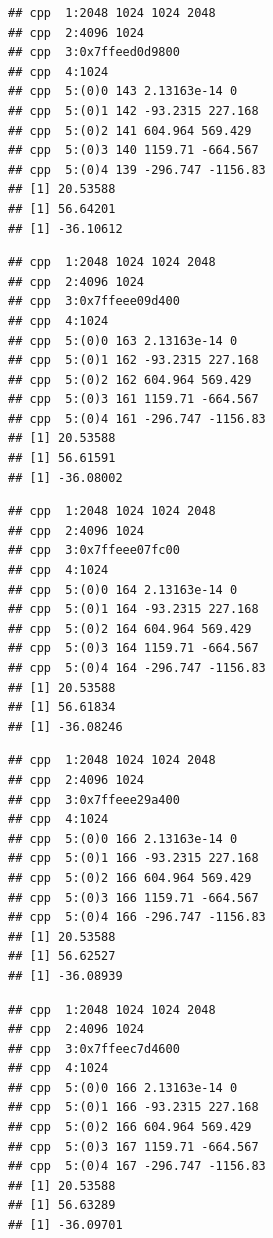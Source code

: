 \documentclass[10pt]{article}\usepackage[]{graphicx}\usepackage[]{color}
\makeatletter
\newenvironment{kframe}{%
 \def\at@end@of@kframe{}%
 \ifinner\ifhmode%
  \def\at@end@of@kframe{\end{minipage}}%
  \begin{minipage}{\columnwidth}%
 \fi\fi%
 \def\FrameCommand##1{\hskip\@totalleftmargin \hskip-\fboxsep
 \colorbox{shadecolor}{##1}\hskip-\fboxsep
     \hskip-\linewidth \hskip-\@totalleftmargin \hskip\columnwidth}%
 \MakeFramed {\advance\hsize-\width
   \@totalleftmargin\z@ \linewidth\hsize
   \@setminipage}}%
 {\par\unskip\endMakeFramed%
 \at@end@of@kframe}
\newenvironment{knitrout}{}{} %
\makeatother
\begin{document}
\begin{knitrout}
\begin{kframe}
{\ttfamily\noindent\itshape\color{messagecolor}{\#\# Stage\ \ 5 est. (Ave. S.V.R. -47.0 dB) \\\#\# f creation}}\begin{verbatim}
## cpp  1:2048 1024 1024 2048
## cpp  2:4096 1024
## cpp  3:0x7ffeed0d9800
## cpp  4:1024
## cpp  5:(0)0 143 2.13163e-14 0
## cpp  5:(0)1 142 -93.2315 227.168
## cpp  5:(0)2 141 604.964 569.429
## cpp  5:(0)3 140 1159.71 -664.567
## cpp  5:(0)4 139 -296.747 -1156.83
## [1] 20.53588
## [1] 56.64201
## [1] -36.10612
\end{verbatim}


{\ttfamily\noindent\itshape\color{messagecolor}{\#\# Stage\ \ 6 est. (Ave. S.V.R. -58.8 dB) \\\#\# f creation}}\begin{verbatim}
## cpp  1:2048 1024 1024 2048
## cpp  2:4096 1024
## cpp  3:0x7ffeee09d400
## cpp  4:1024
## cpp  5:(0)0 163 2.13163e-14 0
## cpp  5:(0)1 162 -93.2315 227.168
## cpp  5:(0)2 162 604.964 569.429
## cpp  5:(0)3 161 1159.71 -664.567
## cpp  5:(0)4 161 -296.747 -1156.83
## [1] 20.53588
## [1] 56.61591
## [1] -36.08002
\end{verbatim}


{\ttfamily\noindent\itshape\color{messagecolor}{\#\# Stage\ \ 7 est. (Ave. S.V.R. -69.9 dB) \\\#\# f creation}}\begin{verbatim}
## cpp  1:2048 1024 1024 2048
## cpp  2:4096 1024
## cpp  3:0x7ffeee07fc00
## cpp  4:1024
## cpp  5:(0)0 164 2.13163e-14 0
## cpp  5:(0)1 164 -93.2315 227.168
## cpp  5:(0)2 164 604.964 569.429
## cpp  5:(0)3 164 1159.71 -664.567
## cpp  5:(0)4 164 -296.747 -1156.83
## [1] 20.53588
## [1] 56.61834
## [1] -36.08246
\end{verbatim}


{\ttfamily\noindent\itshape\color{messagecolor}{\#\# Stage\ \ 8 est. (Ave. S.V.R. -73.0 dB) \\\#\# f creation}}\begin{verbatim}
## cpp  1:2048 1024 1024 2048
## cpp  2:4096 1024
## cpp  3:0x7ffeee29a400
## cpp  4:1024
## cpp  5:(0)0 166 2.13163e-14 0
## cpp  5:(0)1 166 -93.2315 227.168
## cpp  5:(0)2 166 604.964 569.429
## cpp  5:(0)3 166 1159.71 -664.567
## cpp  5:(0)4 166 -296.747 -1156.83
## [1] 20.53588
## [1] 56.62527
## [1] -36.08939
\end{verbatim}


{\ttfamily\noindent\itshape\color{messagecolor}{\#\# Stage\ \ 9 est. (Ave. S.V.R. -74.1 dB) \\\#\# f creation}}\begin{verbatim}
## cpp  1:2048 1024 1024 2048
## cpp  2:4096 1024
## cpp  3:0x7ffeec7d4600
## cpp  4:1024
## cpp  5:(0)0 166 2.13163e-14 0
## cpp  5:(0)1 166 -93.2315 227.168
## cpp  5:(0)2 166 604.964 569.429
## cpp  5:(0)3 167 1159.71 -664.567
## cpp  5:(0)4 167 -296.747 -1156.83
## [1] 20.53588
## [1] 56.63289
## [1] -36.09701
\end{verbatim}



\end{kframe}
\end{knitrout}
\end{document}
